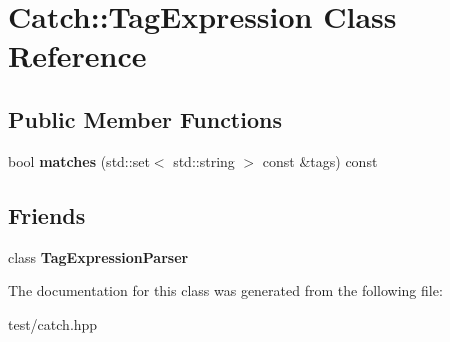 \hypertarget{classCatch_1_1TagExpression}{}\section{Catch\+:\+:Tag\+Expression Class Reference}
\label{classCatch_1_1TagExpression}
\subsection*{Public Member Functions}
\begin{DoxyCompactItemize}
\item 
bool {\bfseries matches} (std\+::set$<$ std\+::string $>$ const \&tags) const \hypertarget{classCatch_1_1TagExpression_a723a46b4d0fd6c06a293b6f7ce116f71}{}\label{classCatch_1_1TagExpression_a723a46b4d0fd6c06a293b6f7ce116f71}

\end{DoxyCompactItemize}
\subsection*{Friends}
\begin{DoxyCompactItemize}
\item 
class {\bfseries Tag\+Expression\+Parser}\hypertarget{classCatch_1_1TagExpression_a73ab9a7179a1b439fb9a97d1fa322e7a}{}\label{classCatch_1_1TagExpression_a73ab9a7179a1b439fb9a97d1fa322e7a}

\end{DoxyCompactItemize}


The documentation for this class was generated from the following file\+:\begin{DoxyCompactItemize}
\item 
test/catch.\+hpp\end{DoxyCompactItemize}
